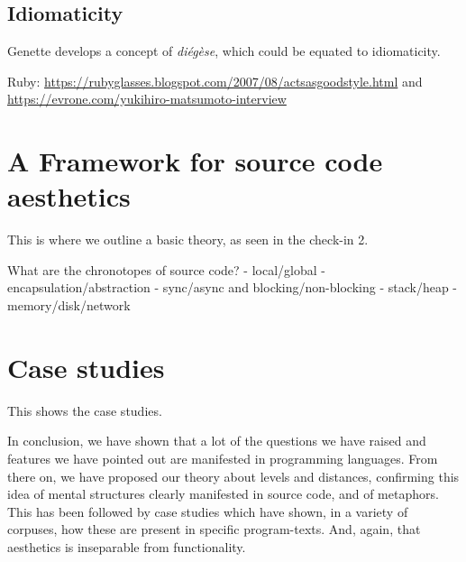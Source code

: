 \subsection{Idiomaticity}
\label{subsec:idiomaticity}

Genette develops a concept of \emph{diégèse}, which could be equated to idiomaticity.

Ruby: \url{https://rubyglasses.blogspot.com/2007/08/actsasgoodstyle.html} and \url{https://evrone.com/yukihiro-matsumoto-interview}

\section{A Framework for source code aesthetics}
\label{sec:programming-aesthetic-framework}

This is where we outline a basic theory, as seen in the check-in 2.

What are the chronotopes of source code?
- local/global
- encapsulation/abstraction
- sync/async and blocking/non-blocking
- stack/heap
- memory/disk/network

\section{Case studies}
\label{sec:case-studies}

This shows the case studies.

\spacer


In conclusion, we have shown that a lot of the questions we have raised and features we have pointed out are manifested in programming languages. From there on, we have proposed our theory about levels and distances, confirming this idea of mental structures clearly manifested in source code, and of metaphors. This has been followed by case studies which have shown, in a variety of corpuses, how these are present in specific program-texts. And, again, that aesthetics is inseparable from functionality.
